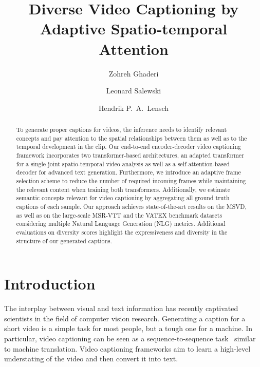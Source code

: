 \documentclass[runningheads,table]{llncs}
\newif\ifreview
\begin{document}
\def\SubNumber{36}




\title{Diverse Video Captioning by Adaptive Spatio-temporal Attention}




\ifreview
\titlerunning{GCPR 2022 Submission \SubNumber{}. CONFIDENTIAL REVIEW COPY.}
	\authorrunning{GCPR 2022 Submission \SubNumber{}. CONFIDENTIAL REVIEW COPY.}
	\author{GCPR 2022 - \GCPRTrack{}}
	\institute{Paper ID \SubNumber}
\else


	\author{Zohreh Ghaderi \and
	Leonard Salewski\and
	Hendrik P.\ A.\ Lensch}

	
\fi
\maketitle



\begin{abstract}
To generate proper captions for videos, the inference needs to identify relevant concepts and pay attention to the spatial relationships between them as well as to the temporal development in the clip.
Our end-to-end encoder-decoder video captioning framework incorporates two transformer-based architectures, an adapted transformer for a single joint spatio-temporal video analysis as well as a self-attention-based decoder for advanced text generation. 
Furthermore, we introduce an adaptive frame selection scheme to reduce the number of required incoming frames while maintaining the relevant content when training both transformers.
Additionally, we estimate semantic concepts relevant for video captioning by aggregating all ground truth captions of each sample.
Our approach achieves state-of-the-art results on the MSVD, as well as on the large-scale MSR-VTT and the VATEX benchmark datasets considering multiple Natural Language Generation (NLG) metrics. 
Additional evaluations on diversity scores highlight the expressiveness and diversity in the structure of our generated captions.


\end{abstract} \section{Introduction}
The interplay between visual and text information has recently captivated scientists in the field of computer vision research. Generating a caption for a short video is a simple task for most people, but a tough one for a machine. In particular, video captioning can be seen as a sequence-to-sequence task~\cite{sutskever2014sequence} similar to machine translation. Video captioning frameworks aim to learn a high-level understating of the video and then convert it into text.
\end{document}
